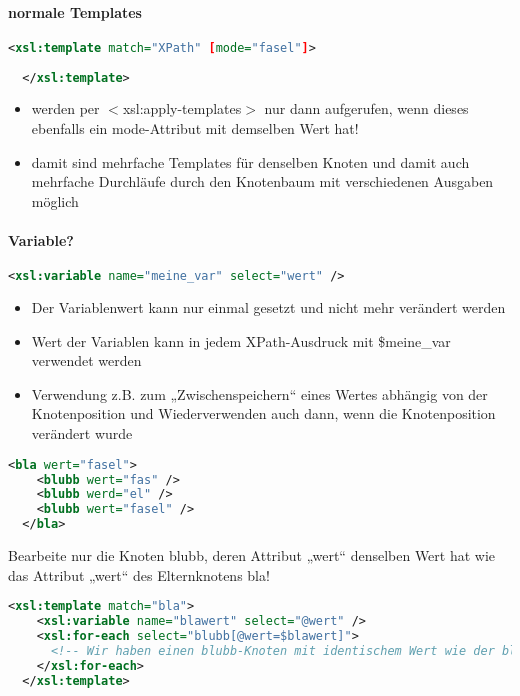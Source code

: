 \paragraph{normale Templates}\hspace{1mm}
\begin{lstlisting}[caption={Normale xsl:template Syntax}, label={lst:xsl:template_normal}, language={XML}]
  <xsl:template match="XPath" [mode="fasel"]>
  
  </xsl:template>
\end{lstlisting}
\begin{itemize}
\item werden per $<$xsl:apply-templates$>$ nur dann aufgerufen, wenn dieses ebenfalls ein mode-Attribut mit demselben Wert hat!
\item damit sind mehrfache Templates für denselben Knoten und damit auch mehrfache Durchläufe durch den Knotenbaum mit verschiedenen Ausgaben möglich
\end{itemize}

\paragraph{Variable?}\hspace{1mm}
\begin{lstlisting}[caption={xsl:variable Syntax}, label={lst:xsl:variable}, language={XML}]
  <xsl:variable name="meine_var" select="wert" />
\end{lstlisting}
\begin{itemize}
\item Der Variablenwert kann nur einmal gesetzt und nicht mehr verändert werden
\item Wert der Variablen kann in jedem XPath-Ausdruck mit \$meine\_var verwendet werden
\item Verwendung z.B. zum „Zwischenspeichern“ eines Wertes abhängig von der Knotenposition und Wiederverwenden auch dann, wenn die Knotenposition verändert wurde
\end{itemize}
\begin{lstlisting}[caption={Beispiel für Variablendeklaration}, label={lst:xsl:variable}, language={XML}]
  <bla wert="fasel">
    <blubb wert="fas" />
    <blubb werd="el" />
    <blubb wert="fasel" />
  </bla>
\end{lstlisting}
Bearbeite nur die Knoten blubb, deren Attribut „wert“ denselben Wert hat wie das Attribut „wert“ des Elternknotens bla!\\
\begin{lstlisting}[caption={Beispiel für Variable in Template}, label={lst:xsl:variable_in_template}, language={XML}]
  <xsl:template match="bla">
    <xsl:variable name="blawert" select="@wert" />
    <xsl:for-each select="blubb[@wert=$blawert]">
      <!-- Wir haben einen blubb-Knoten mit identischem Wert wie der bla-Knoten! -->
    </xsl:for-each>
  </xsl:template>
\end{lstlisting}

